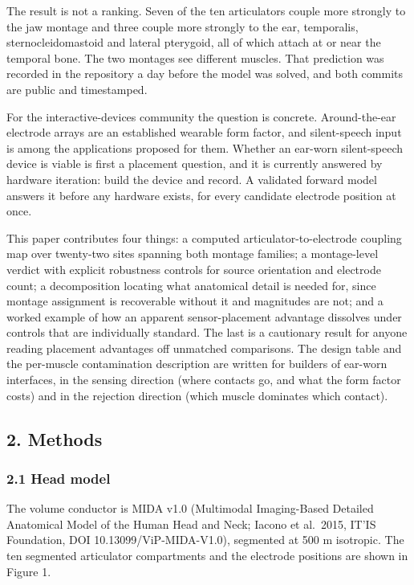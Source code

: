 \documentclass[manuscript,review,anonymous]{acmart}
\begin{document}
The result is not a ranking. Seven of the ten articulators couple more strongly
to the jaw montage and three couple more strongly to the ear, temporalis,
sternocleidomastoid and lateral pterygoid, all of which attach at or near the
temporal bone. The two montages see different muscles. That prediction was
recorded in the repository a day before the model was solved, and both commits
are public and timestamped.

For the interactive-devices community the question is concrete. Around-the-ear
electrode arrays are an established wearable form factor, and silent-speech
input is among the applications proposed for them. Whether an ear-worn
silent-speech device is viable is first a placement question, and it is
currently answered by hardware iteration: build the device and record. A
validated forward model answers it before any hardware exists, for every
candidate electrode position at once.

This paper contributes four things: a computed articulator-to-electrode
coupling map over twenty-two sites spanning both montage families; a
montage-level verdict with explicit robustness controls for source orientation
and electrode count; a decomposition locating what anatomical detail is needed
for, since montage assignment is recoverable without it and magnitudes are
not; and a worked example of how an apparent sensor-placement advantage
dissolves under controls that are individually standard. The last is a
cautionary result for anyone reading placement advantages off unmatched
comparisons. The design table and the per-muscle contamination description are
written for builders of ear-worn interfaces, in the sensing direction (where
contacts go, and what the form factor costs) and in the rejection direction
(which muscle dominates which contact).

\subsection{2. Methods}\label{methods}

\subsubsection{2.1 Head model}\label{head-model}

The volume conductor is MIDA v1.0 (Multimodal Imaging-Based Detailed Anatomical
Model of the Human Head and Neck; Iacono et al.~2015, IT'IS Foundation, DOI
10.13099/ViP-MIDA-V1.0), segmented at 500 \textmu{}m isotropic. The ten segmented
articulator compartments and the electrode positions are shown in Figure 1.
\end{document}
